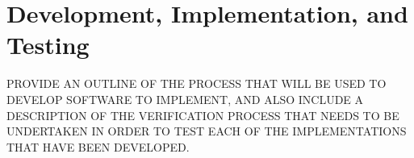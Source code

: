 \section{Development, Implementation, and Testing}

PROVIDE AN OUTLINE OF THE PROCESS THAT WILL BE USED TO DEVELOP SOFTWARE TO IMPLEMENT, AND ALSO INCLUDE A DESCRIPTION OF THE VERIFICATION PROCESS THAT NEEDS TO BE UNDERTAKEN IN ORDER TO TEST EACH OF THE IMPLEMENTATIONS THAT HAVE BEEN DEVELOPED.